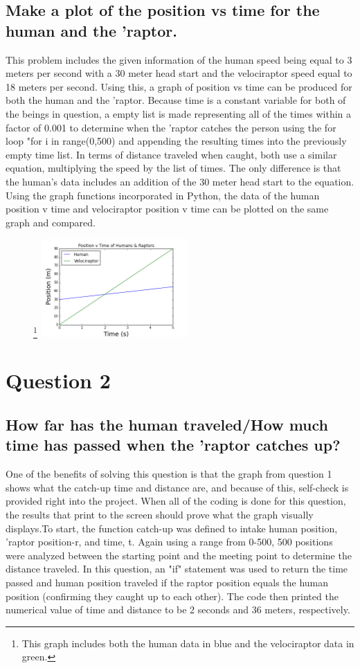 \documentclass[twocolumn]{revtex4}
\begin{document}
\subsection{Make a plot of the position vs time for the human and the 'raptor.}
This problem includes the given information of the human speed being equal to 3 meters per second with a 30 meter head start and the velociraptor speed equal to 18 meters per second. Using this, a graph of position vs time can be produced for both the human and the 'raptor. Because time is a constant variable for both of the beings in question, a empty list is made representing all of the times within a factor of 0.001 to determine when the 'raptor catches the person using the for loop "for i in range(0,500) and appending the resulting times into the previously empty time list. In terms of distance traveled when caught, both use a similar equation, multiplying the speed by the list of times. The only difference is that the human's data includes an addition of the 30 meter head start to the equation. Using the graph functions incorporated in Python, the data of the human position v time and velociraptor position v time can be plotted on the same graph and compared.


\begin{figure}[h]
\centering
\footnote{This graph includes both the human data in blue and the velociraptor data in green.\label{fig:graph1}}
\includegraphics[width=0.5\textwidth]{final_graph_1.png}
\end{figure}

\section{Question 2}
\subsection{How far has the human traveled/How much time has passed when the 'raptor catches up?}
One of the benefits of solving this question is that the graph from question 1 shows what the catch-up time and distance are, and because of this, self-check is provided right into the project. When all of the coding is done for this question, the results that print to the screen should prove what the graph visually displays.To start, the function catch-up was defined to intake human position, 'raptor position-r, and time, t. Again using a range from 0-500, 500 positions were analyzed between the starting point and the meeting point to determine the distance traveled. In this question, an "if" statement was used to return the time passed and human position traveled if the raptor position equals the human position (confirming they caught up to each other). The code then printed the numerical value of time and distance to be 2 seconds and 36 meters, respectively.
\end{document}
